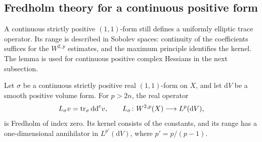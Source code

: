 \subsection{Fredholm theory for a continuous positive form}
\label{sec:continuous-hermitian-fredholm}

A continuous strictly positive $(1,1)$-form still defines a uniformly
elliptic trace operator. Its range is described in Sobolev spaces:
continuity of the coefficients suffices for the $W^{2,p}$ estimates,
and the maximum principle identifies the kernel. The lemma is used for
continuous positive complex Hessians in the next subsection.

\begin{lemma}\label{lem:continuous-hermitian-fredholm}
Let $\sigma$ be a continuous strictly positive real $(1,1)$-form on $X$,
and let $\mathrm dV$ be a smooth positive volume form.
For $p>2n$, the real operator
\[
 L_\sigma v=\operatorname{tr}_\sigma\mathrm{dd}^{\mathrm{c}} v,
 \qquad L_\sigma\colon W^{2,p}(X)\longrightarrow L^p(\mathrm dV),
\]
is Fredholm of index zero. Its kernel consists of the constants, and
its range has a one-dimensional annihilator in $L^{p'}(\mathrm dV)$,
where $p'=p/(p-1)$.
\end{lemma}
